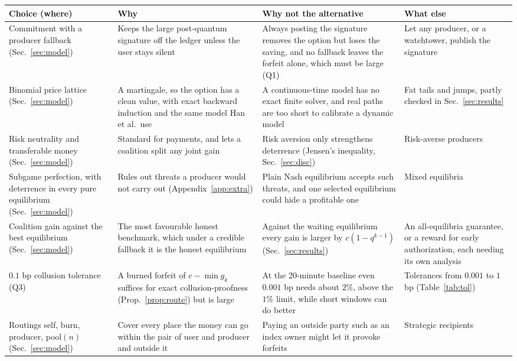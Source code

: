 \documentclass[11pt]{article}
\renewcommand{\arraystretch}{1.12}
\begin{document}
\begin{table}[htbp]\centering\scriptsize
\renewcommand{\arraystretch}{1.15}
\begin{tabularx}{\textwidth}{|>{\raggedright\arraybackslash}p{2.3cm}|Y|Y|Y|}
\hline
{}Choice (where) & Why & Why not the alternative & What else \\
\hline
Commitment with a producer fallback (Sec.~\ref{sec:model}) & Keeps the large post-quantum signature off the ledger unless the user stays silent & Always posting the signature removes the option but loses the saving, and no fallback leaves the forfeit alone, which must be large (Q1) & Let any producer, or a watchtower, publish the signature \\
\hline
Binomial price lattice (Sec.~\ref{sec:model}) & A martingale, so the option has a clean value, with exact backward induction and the same model Han et al.\ use & A continuous-time model has no exact finite solver, and real paths are too short to calibrate a dynamic model & Fat tails and jumps, partly checked in Sec.~\ref{sec:results} \\
\hline
Risk neutrality and transferable money (Sec.~\ref{sec:model}) & Standard for payments, and lets a coalition split any joint gain & Risk aversion only strengthens deterrence (Jensen's inequality, Sec.~\ref{sec:disc}) & Risk-averse producers \\
\hline
Subgame perfection, with deterrence in every pure equilibrium (Sec.~\ref{sec:model}) & Rules out threats a producer would not carry out (Appendix~\ref{app:extra}) & Plain Nash equilibrium accepts such threats, and one selected equilibrium could hide a profitable one & Mixed equilibria \\
\hline
Coalition gain against the best equilibrium (Sec.~\ref{sec:model}) & The most favourable honest benchmark, which under a credible fallback it is the honest equilibrium & Against the waiting equilibrium every gain is larger by $c(1-q^{k-1})$ (Sec.~\ref{sec:results}) & An all-equilibria guarantee, or a reward for early authorization, each needing its own analysis \\
\hline
$0.1$ bp collusion tolerance (Q3) & A burned forfeit of $c-\min g_k$ suffices for exact collusion-proofness (Prop.~\ref{prop:route}) but is large & At the 20-minute baseline even $0.001$ bp needs about $2\%$, above the $1\%$ limit, while short windows can do better & Tolerances from $0.001$ to $1$ bp (Table~\ref{tab:tol}) \\
\hline
Routings self, burn, producer, pool$(n)$ (Sec.~\ref{sec:model}) & Cover every place the money can go within the pair of user and producer and outside it & Paying an outside party such as an index owner might let it provoke forfeits & Strategic recipients \\

\end{tabularx}
\end{table}
\end{document}

